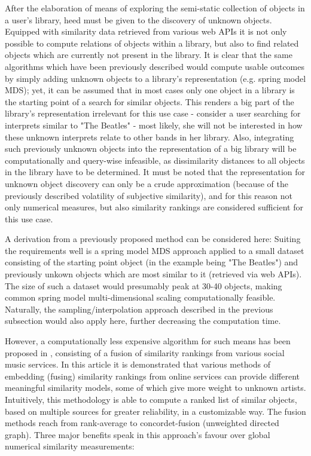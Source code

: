 After the elaboration of means of exploring the semi-static collection of objects in a user's library, heed must be given to the discovery of unknown objects. Equipped with similarity data retrieved from various web APIs it is not only possible to compute relations of objects within a library, but also to find related objects which are currently not present in the library. It is clear that the same algorithms which have been previously described would compute usable outcomes by simply adding unknown objects to a library's representation (e.g. spring model MDS); yet, it can be assumed that in most cases only one object in a library is the starting point of a search for similar objects. This renders a big part of the library's representation irrelevant for this use case - consider a user searching for interprets similar to "The Beatles" - most likely, she will not be interested in how these unknown interprets relate to other bands in her library. Also, integrating such previously unknown objects into the representation of a big library will be computationally and query-wise infeasible, as dissimilarity distances to all objects in the library have to be determined. It must be noted that the representation for unknown object discovery can only be a crude approximation (because of the previously described volatility of subjective similarity), and for this reason not only numerical measures, but also similarity rankings are considered sufficient for this use case.

A derivation from a previously proposed method can be considered here: Suiting the requirements well is a spring model MDS approach applied to a small dataset consisting of the starting point object (in the example being "The Beatles") and previously unkown objects which are most similar to it (retrieved via web APIs). The size of such a dataset would presumably peak at 30-40 objects, making common spring model multi-dimensional scaling computationally feasible. Naturally, the sampling/interpolation approach described in the previous subsection would also apply here, further decreasing the computation time.

However, a computationally less expensive algorithm for such means has been proposed in \cite{Marshall:2010}, consisting of a fusion of similarity rankings from various social music services. In this article it is demonstrated that various methods of embedding (fusing) similarity rankings from online services can provide different meaningful similarity models, some of which give more weight to unknown artists. Intuitively, this methodology is able to compute a ranked list of similar objects, based on multiple sources for greater reliability, in a customizable way. The fusion methods reach from rank-average to concordet-fusion (unweighted directed graph). Three major benefits speak in this approach's favour over global numerical similarity measurements:

